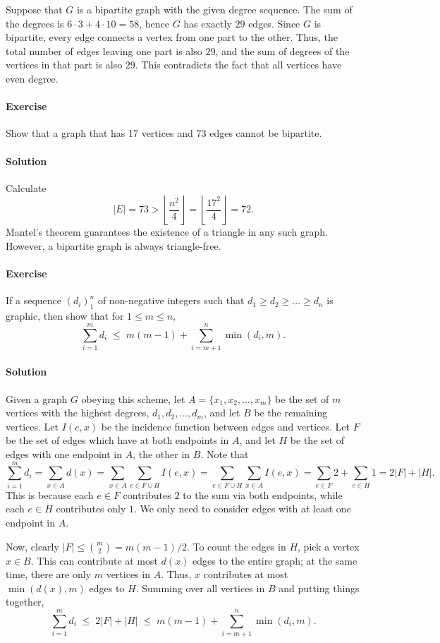 \documentclass[10pt]{article}
\newcounter{prob}
\newcommand{\problem}{\stepcounter{prob}\paragraph{Exercise \arabic{prob}}}
\newcommand{\solution}{\paragraph{Solution}}
\begin{document}
\begin{enumerate}
        Suppose that $G$ is a bipartite graph with the given degree sequence. The sum
        of the degrees is $6\cdot 3 + 4\cdot 10 = 58$, hence $G$ has exactly $29$
        edges. Since $G$ is bipartite, every edge connects a vertex from one part to
        the other. Thus, the total number of edges leaving one part is also $29$, and
        the sum of degrees of the vertices in that part is also $29$. This
        contradicts the fact that all vertices have even degree.
    \end{enumerate}

    \problem Show that a graph that has 17 vertices and 73 edges cannot be bipartite.

    \solution Calculate \[
        |E| = 73 > \left\lfloor \frac{n^2}{4}\right\rfloor = \left\lfloor
        \frac{17^2}{4} \right\rfloor = 72.
    \] Mantel's theorem guarantees the existence of a triangle in any such graph.
    However, a bipartite graph is always triangle-free.

    \problem If a sequence $(d_i)_1^n$ of non-negative integers such that $d_1 \geq
    d_2 \geq \dots \geq d_n$ is graphic, then show that for $1 \leq m \leq n$, \[
        \sum_{i = 1}^m d_i \;\leq\; m(m - 1) + \sum_{i = m + 1}^n \min(d_i, m).
    \]

    \solution Given a graph $G$ obeying this scheme, let $A = \{x_1, x_2, \dots,
    x_m\}$ be the set of $m$ vertices with the highest degrees, $d_1, d_2, \dots,
    d_m$, and let $B$ be the remaining vertices. Let $I(e, x)$ be the incidence
    function between edges and vertices. Let $F$ be the set of edges which have at
    both endpoints in $A$, and let $H$ be the set of edges with one endpoint in $A$,
    the other in $B$. Note that \[
        \sum_{i = 1}^m d_i = \sum_{x \in A} d(x) = \sum_{x \in A} \sum_{e \in F\cup
        H} I(e, x) = \sum_{e \in F \cup H} \sum_{x \in A} I(e, x) = \sum_{e \in F} 2
        + \sum_{e \in H} 1 = 2 |F| + |H|.
    \] This is because each $e \in F$ contributes $2$ to the sum via both endpoints,
    while each $e \in H$ contributes only $1$. We only need to consider edges with at
    least one endpoint in $A$.

    Now, clearly $|F| \leq \binom{m}{2} = m(m - 1) / 2$. To count the edges in $H$,
    pick a vertex $x \in B$. This can contribute at most $d(x)$ edges to the entire
    graph; at the same time, there are only $m$ vertices in $A$. Thus, $x$
    contributes at most $\min(d(x), m)$ edges to $H$. Summing over all vertices in
    $B$ and putting things together, \[
        \sum_{i = 1}^m d_i \;\leq\; 2|F| + |H| \;\leq\; m(m - 1) + \sum_{i = m + 1}^n
        \min(d_i, m).
    \] 
\end{document}

